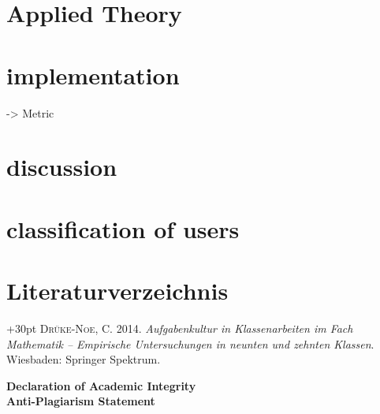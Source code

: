 \documentclass[a4paper,12pt]{scrartcl}
\begin{document}
\newpage
\setcounter{page}{1}









\section{Applied Theory}



















\section{implementation}
-> Metric

\section{discussion}

\section{classification of users}




\newpage
\section{Literaturverzeichnis}
\printbibliography
\hangindent+30pt 
\textsc{Drüke-Noe, C.} 2014. \textit{Aufgabenkultur in Klassenarbeiten im Fach Mathematik – Empirische Untersuchungen in neunten und zehnten Klassen}. Wiesbaden:
Springer Spektrum.









\newpage
{}
\vspace*{1cm}
\begin{center}
	\Large \textbf{Declaration of Academic Integrity}\\
	
	\large \textbf{Anti-Plagiarism Statement}
\end{center}
\end{document}

